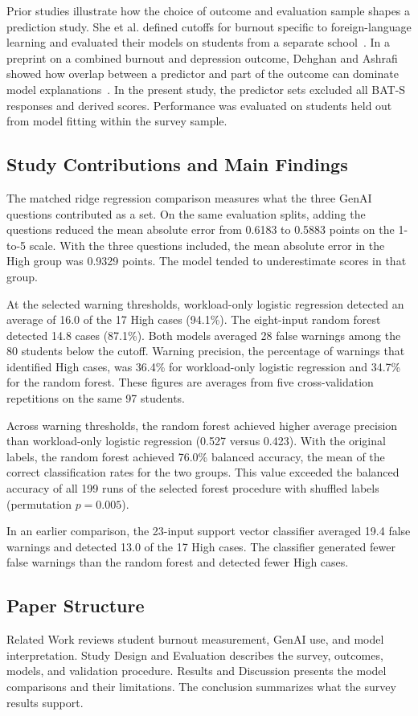 Prior studies illustrate how the choice of outcome and evaluation sample shapes a prediction study. She et al. defined cutoffs for burnout specific to foreign-language learning and evaluated their models on students from a separate school~\cite{she2026languageburnout}. In a preprint on a combined burnout and depression outcome, Dehghan and Ashrafi showed how overlap between a predictor and part of the outcome can dominate model explanations~\cite{dehghan2026overlap}. In the present study, the predictor sets excluded all BAT-S responses and derived scores. Performance was evaluated on students held out from model fitting within the survey sample.

\subsection{Study Contributions and Main Findings}

The matched ridge regression comparison measures what the three GenAI questions contributed as a set. On the same evaluation splits, adding the questions reduced the mean absolute error from 0.6183 to 0.5883 points on the 1-to-5 scale. With the three questions included, the mean absolute error in the High group was 0.9329 points. The model tended to underestimate scores in that group.

At the selected warning thresholds, workload-only logistic regression detected an average of 16.0 of the 17 High cases (94.1\%). The eight-input random forest detected 14.8 cases (87.1\%). Both models averaged 28 false warnings among the 80 students below the cutoff. Warning precision, the percentage of warnings that identified High cases, was 36.4\% for workload-only logistic regression and 34.7\% for the random forest. These figures are averages from five cross-validation repetitions on the same 97 students.

Across warning thresholds, the random forest achieved higher average precision than workload-only logistic regression (0.527 versus 0.423). With the original labels, the random forest achieved 76.0\% balanced accuracy, the mean of the correct classification rates for the two groups. This value exceeded the balanced accuracy of all 199 runs of the selected forest procedure with shuffled labels (permutation \(p = 0.005\)).

In an earlier comparison, the 23-input support vector classifier averaged 19.4 false warnings and detected 13.0 of the 17 High cases. The classifier generated fewer false warnings than the random forest and detected fewer High cases.

\subsection{Paper Structure}

Related Work reviews student burnout measurement, GenAI use, and model interpretation. Study Design and Evaluation describes the survey, outcomes, models, and validation procedure. Results and Discussion presents the model comparisons and their limitations. The conclusion summarizes what the survey results support.
